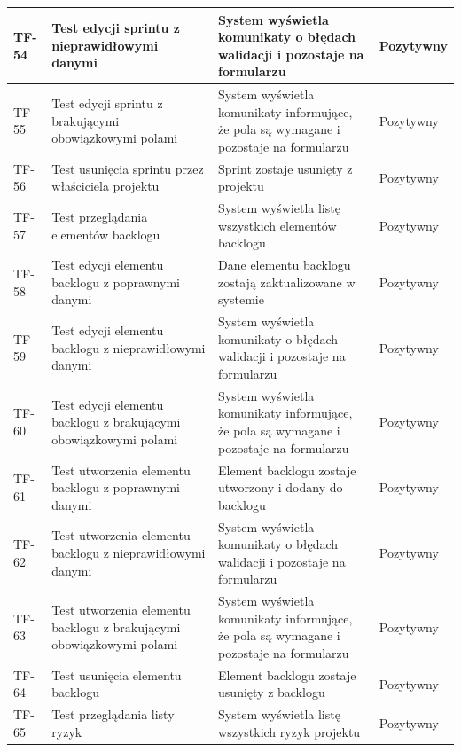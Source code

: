 \begin{longtable}{|p{2cm}|p{6cm}|p{5cm}|p{2.5cm}|}
TF-54 & Test edycji sprintu z nieprawidłowymi danymi & System wyświetla komunikaty o błędach walidacji i pozostaje na formularzu & Pozytywny \\ \hline

TF-55 & Test edycji sprintu z brakującymi obowiązkowymi polami & System wyświetla komunikaty informujące, że pola są wymagane i pozostaje na formularzu & Pozytywny \\ \hline

TF-56 & Test usunięcia sprintu przez właściciela projektu & Sprint zostaje usunięty z projektu & Pozytywny \\ \hline

TF-57 & Test przeglądania elementów backlogu & System wyświetla listę wszystkich elementów backlogu & Pozytywny \\ \hline

TF-58 & Test edycji elementu backlogu z poprawnymi danymi & Dane elementu backlogu zostają zaktualizowane w systemie & Pozytywny \\ \hline

TF-59 & Test edycji elementu backlogu z nieprawidłowymi danymi & System wyświetla komunikaty o błędach walidacji i pozostaje na formularzu & Pozytywny \\ \hline

TF-60 & Test edycji elementu backlogu z brakującymi obowiązkowymi polami & System wyświetla komunikaty informujące, że pola są wymagane i pozostaje na formularzu & Pozytywny \\ \hline

TF-61 & Test utworzenia elementu backlogu z poprawnymi danymi & Element backlogu zostaje utworzony i dodany do backlogu & Pozytywny \\ \hline

TF-62 & Test utworzenia elementu backlogu z nieprawidłowymi danymi & System wyświetla komunikaty o błędach walidacji i pozostaje na formularzu & Pozytywny \\ \hline

TF-63 & Test utworzenia elementu backlogu z brakującymi obowiązkowymi polami & System wyświetla komunikaty informujące, że pola są wymagane i pozostaje na formularzu & Pozytywny \\ \hline

TF-64 & Test usunięcia elementu backlogu & Element backlogu zostaje usunięty z backlogu & Pozytywny \\ \hline

TF-65 & Test przeglądania listy ryzyk & System wyświetla listę wszystkich ryzyk projektu & Pozytywny \\ \hline


\end{longtable}
